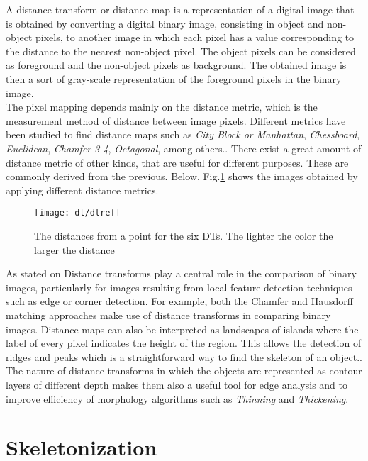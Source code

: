 A distance transform or distance map is a representation of a digital image
that is obtained by converting a digital binary image, consisting in object
and non-object pixels, to another image in which each pixel has a value
corresponding to the distance to the nearest non-object pixel. The object 
pixels can be considered as foreground and the non-object pixels as
background. The obtained image is then a sort of gray-scale representation
of the foreground pixels in the binary image.\\
The pixel mapping depends mainly on the distance metric, which is the 
measurement method of distance between image pixels. Different metrics have been 
studied  to find distance maps such as 
\emph{City Block or Manhattan},
\emph{Chessboard}, \emph{Euclidean}, \emph{Chamfer 3-4}, \emph{Octagonal}, among
others.\cite[p.363]{dtresearch}. There exist a great amount of
distance metric of other kinds, that are useful for different purposes.
These are commonly derived from the previous.
Below, Fig.\ref{fig:dtexamples} shows the images obtained by applying different distance metrics.

\begin{figure}[h t b p ! H]
 \centering
   \texttt{[image: dt/dtref]}
 \caption{The distances from a point for the six DTs.
 The lighter the color the larger the distance \cite[p.365]{dtresearch}}
 \label{fig:dtexamples}
\end{figure}

As stated on \cite{dtresearch2} 
Distance transforms play a central role in the comparison of binary images, 
particularly for images resulting from local feature detection techniques such 
as edge or corner detection. For example, both the Chamfer
and Hausdorff matching approaches make use of distance transforms in comparing binary images. 
Distance maps can also be interpreted as landscapes of islands 
where the label of every pixel indicates the height of the region. This allows
the detection of ridges and peaks which is a straightforward way to find the
skeleton of an object.\cite[237]{ridgedt}. The nature of distance transforms
in which the objects are represented as contour layers of different depth
makes them also a useful tool for edge analysis and to improve efficiency of 
morphology algorithms such as \emph{Thinning} and \emph{Thickening}.\\

\section{Skeletonization}
\label{sec:skeletonization}

